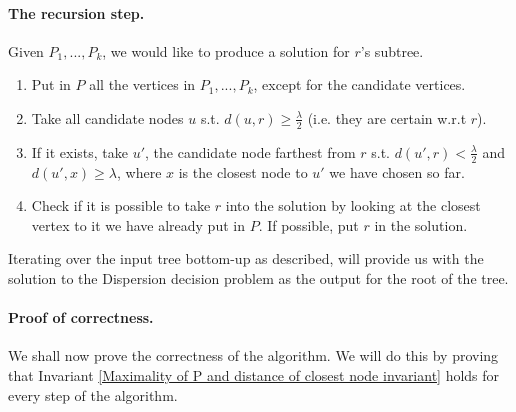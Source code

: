 \documentclass[11pt,a4paper]{article}
\theoremstyle{definition}
\theoremstyle{remark}
\begin{document}
\paragraph{The recursion step.} Given $P_{1},...,P_{k}$, we would like to produce a solution for $r$'s subtree.
\begin{enumerate}
\item Put in $P$ all the vertices in $P_{1},...,P_{k}$, except for the candidate vertices.
\item Take all candidate nodes $u$ s.t. $d(u,r) \geq \frac{\lambda}{2}$ (i.e. they are certain w.r.t $r$).
\item If it exists, take $u'$, the candidate node farthest from $r$ s.t. $d(u',r) < \frac{\lambda}{2}$ and $d(u',x)\geq \lambda$, where $x$ is the closest node to $u'$ we have chosen so far.
\item Check if it is possible to take $r$ into the solution by looking at the closest vertex to it we have already put in $P$. If possible, put $r$ in the solution.
\end{enumerate}
Iterating over the input tree bottom-up as described, will provide us with the solution to the Dispersion decision problem as the output for the root of the tree.

\paragraph{Proof of correctness.}
We shall now prove the correctness of the algorithm. We will do this by proving that Invariant \ref{Maximality of P and distance of closest node invariant} holds for every step of the algorithm.
\end{document}
